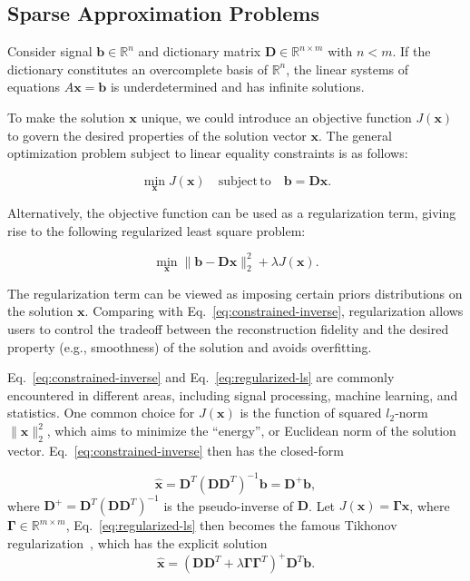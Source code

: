 \subsection{Sparse Approximation Problems}

Consider signal $\mathbf{b}\in\mathbb{R}^n$ and dictionary matrix
$\mathbf{D}\in\mathbb{R}^{n\times m}$ with $n<m$. If the dictionary constitutes an
overcomplete basis of $\mathbb{R}^n$, the linear systems of
equations $A\mathbf{x}=\mathbf{b}$ is underdetermined and has infinite solutions.

To make the solution $\mathbf{x}$ unique, we could introduce an objective function
$J(\mathbf{x})$ to govern the desired properties of the solution vector $\mathbf{x}$.
The general optimization problem subject to linear equality constraints is as follows:

\begin{equation}
\label{eq:constrained-inverse}
\min_\mathbf{x} J(\mathbf{x}) \quad \mathrm{subject\,to} \quad \mathbf{b}=\mathbf{D}\mathbf{x}.
\end{equation}

Alternatively, the objective function can be used as a regularization term, giving rise to
the following regularized least square problem:

\begin{equation}
\label{eq:regularized-ls}
\min_\mathbf{x} \|\mathbf{b}-\mathbf{D}\mathbf{x}\|_2^2 + \lambda J(\mathbf{x}).
\end{equation}

The regularization term can be viewed as imposing certain priors distributions on
the solution $\mathbf{x}$. Comparing with Eq.~\ref{eq:constrained-inverse}, regularization
allows users to control the tradeoff between the reconstruction fidelity and the
desired property (e.g., smoothness) of the solution and avoids overfitting.

Eq.~\ref{eq:constrained-inverse} and Eq.~\ref{eq:regularized-ls} are commonly encountered in different
areas, including signal processing, machine learning, and statistics. One common choice for $J(\mathbf{x})$
is the function of squared $l_2$-norm $\|\mathbf{x}\|_2^2$, which aims to minimize the ``energy'', or Euclidean
norm of the solution vector. Eq.~\ref{eq:constrained-inverse} then has the closed-form

\begin{equation}
\hat{\mathbf{x}}=\mathbf{D}^T(\mathbf{D}\mathbf{D}^T)^{-1}\mathbf{b}=\mathbf{D}^{+}\mathbf{b},
\end{equation}
where $\mathbf{D}^{+}=\mathbf{D}^T(\mathbf{D}\mathbf{D}^T)^{-1}$ is the pseudo-inverse
of $\mathbf{D}$. Let $J(\mathbf{x})=\mathbf{\Gamma}\mathbf{x}$, where $\mathbf{\Gamma}\in\mathbb{R}^{m\times m}$,
Eq.~\ref{eq:regularized-ls} then becomes the famous Tikhonov regularization~\cite{Golub1999}, which has the
explicit solution
\begin{equation}
\hat{\mathbf{x}} = (\mathbf{D}\mathbf{D}^T + \lambda \mathbf{\Gamma}\mathbf{\Gamma}^T)^{+}\mathbf{D}^T\mathbf{b}.
\end{equation}

